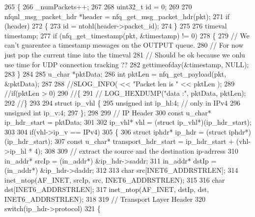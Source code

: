 \begin{DoxyCode}
265 \{
266     \_numPackets++;
267 
268     uint32\_t \textcolor{keywordtype}{id} = 0;
269 
270     nfqnl\_msg\_packet\_hdr *header = nfq\_get\_msg\_packet\_hdr(pkt);
271     \textcolor{keywordflow}{if} (header) 
272     \{
273         \textcolor{keywordtype}{id} = ntohl(header->packet\_id);
274     \}
275 
276     timeval timestamp;
277     \textcolor{keywordflow}{if} (nfq\_get\_timestamp(pkt, &timestamp) != 0) 
278     \{
279         \textcolor{comment}{// We can't guarentee a timestamp messages on the OUTPUT queue.}
280         \textcolor{comment}{// For now just pop the current time into the timeval}
281         \textcolor{comment}{// Should be ok because we onlu use time for UDP connection tracking ??}
282         gettimeofday(&timestamp, NULL);
283     \}
284 
285     u\_char *pktData;
286     \textcolor{keywordtype}{int} pktLen = nfq\_get\_payload(pkt, &pktData);
287 
288     \textcolor{comment}{//SLOG\_INFO( << "Packet len is " << pktLen );}
289     \textcolor{comment}{//if(pktLen > 0)}
290     \textcolor{comment}{//\{}
291     \textcolor{comment}{//      LOG\_HEXDUMP("data :", pktData, pktLen);}
292     \textcolor{comment}{//\}}
293 
294     \textcolor{keyword}{struct }ip\_vhl \{
295         \textcolor{keywordtype}{unsigned} \textcolor{keywordtype}{int} ip\_hl:4; \textcolor{comment}{// only in IPv4}
296         \textcolor{keywordtype}{unsigned} \textcolor{keywordtype}{int} ip\_v:4;
297     \};  
298 
299     \textcolor{comment}{// IP Header}
300     \textcolor{keyword}{const} u\_char* ip\_hdr\_start = pktData;
301 
302     ip\_vhl* vhl = (\textcolor{keyword}{struct }ip\_vhl*)(ip\_hdr\_start);
303 
304     \textcolor{keywordflow}{if}(vhl->ip\_v == IPv4)
305     \{
306         \textcolor{keyword}{struct }iphdr* ip\_hdr = (\textcolor{keyword}{struct }iphdr*)(ip\_hdr\_start);
307         \textcolor{keyword}{const} u\_char* transport\_hdr\_start = ip\_hdr\_start + (vhl->ip\_hl * 4);
308 
309         \textcolor{comment}{// extract the source and the destination ip-adrress}
310         in\_addr* srcIp = (in\_addr*) &ip\_hdr->saddr;
311         in\_addr* dstIp = (in\_addr*) &ip\_hdr->daddr;
312 
313         \textcolor{keywordtype}{char} src[INET6\_ADDRSTRLEN];
314         inet\_ntop(AF\_INET, srcIp, src, INET6\_ADDRSTRLEN);
315 
316         \textcolor{keywordtype}{char} dst[INET6\_ADDRSTRLEN];
317         inet\_ntop(AF\_INET, dstIp, dst, INET6\_ADDRSTRLEN);
318 
319         \textcolor{comment}{// Transport Layer Header}
320         \textcolor{keywordflow}{switch}(ip\_hdr->protocol)
321         \{

\end{DoxyCode}
